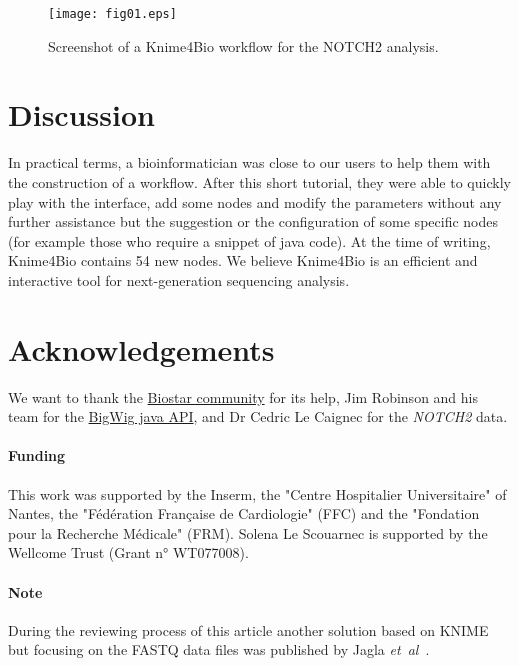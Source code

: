 \documentclass{bioinfo}
\begin{document}
\begin{figure}[!tpb]%
\centerline{\texttt{[image: fig01.eps]}}
\caption{Screenshot of a Knime4Bio workflow for the NOTCH2 analysis.}\label{fig:x1}
\end{figure}

\section{Discussion}
In practical terms, a bioinformatician was close to our users to help them with the construction of a workflow. After this short tutorial, they were able to quickly play with the interface, add some nodes and modify the parameters without any further assistance but the suggestion or the configuration of some specific nodes (for example those who require a snippet of java code).  At the time of writing, Knime4Bio contains 54 new nodes. We believe Knime4Bio is an efficient and interactive tool for next-generation sequencing analysis.

\section*{Acknowledgements}
We want to thank the  \href{http://biostar.stackexchange.com/}{Biostar community} for its help, Jim Robinson and his team for the \href{http://code.google.com/p/bigwig/}{BigWig java API}, and Dr Cedric Le Caignec for the \textit{NOTCH2} data.

\paragraph{Funding\textcolon} This work was supported by the Inserm, the "Centre Hospitalier Universitaire" of Nantes, the "F\'{e}d\'{e}ration Fran\c{c}aise de Cardiologie" (FFC) and the "Fondation pour la Recherche M\'{e}dicale" (FRM). Solena Le Scouarnec is supported by the Wellcome Trust (Grant n° WT077008).

\paragraph{Note\textcolon} During the reviewing process of this article another solution based on KNIME but focusing on the FASTQ data files was published by Jagla \textit{et~al}~\citep{pmid21873641}.
\\


\end{document}
